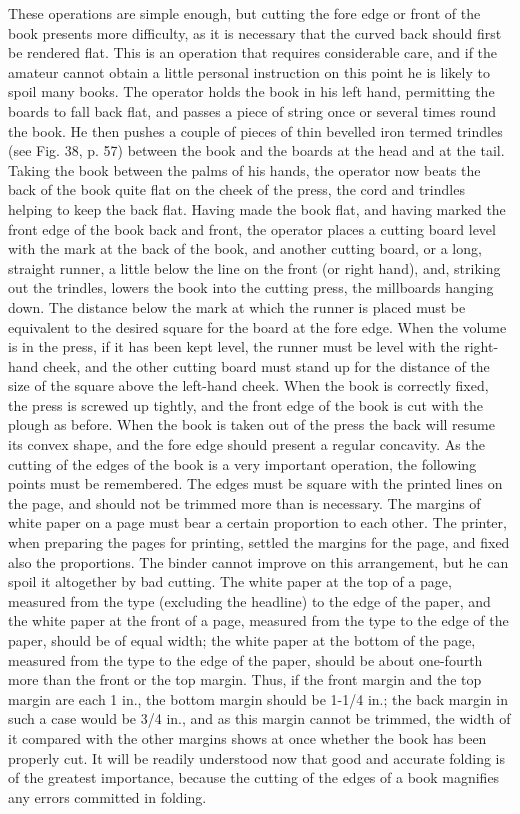 \documentclass[twoside]{book}
\begin{document}
These operations are simple enough, but cutting
the fore edge or front of the book presents more
difficulty, as it is necessary that the curved back
should first be rendered flat. This is an operation
that requires considerable care, and if the amateur
cannot obtain a little personal instruction on this
point he is likely to spoil many books. The operator
holds the book in his left hand, permitting the
boards to fall back flat, and passes a piece of string
once or several times round the book. He then
pushes a couple of pieces of thin bevelled iron
termed trindles (see Fig. 38, p. 57) between the
book and the boards at the head and at the tail.
Taking the book between the palms of his hands,
the operator now beats the back of the book
quite flat on the cheek of the press, the cord
and trindles helping to keep the back flat.
Having made the book flat, and having marked
the front edge of the book back and front, the
operator places a cutting board level with the
\pagebreak
mark at the back of the book, and another cutting
board, or a long, straight runner, a little below the
line on the front (or right hand), and, striking out
the trindles, lowers the book into the cutting press,
the millboards hanging down. The distance below
the mark at which the runner is placed must be
equivalent to the desired square for the board at
the fore edge. When the volume is in the press, if
it has been kept level, the runner must be level
with the right-hand cheek, and the other cutting
board must stand up for the distance of the size of
the square above the left-hand cheek. When the
book is correctly fixed, the press is screwed up
tightly, and the front edge of the book is cut with
the plough as before. When the book is taken out
of the press the back will resume its convex shape,
and the fore edge should present a regular concavity.
As the cutting of the edges of the book is a very
important operation, the following points must be
remembered. The edges must be square with the
printed lines on the page, and should not be
trimmed more than is necessary. The margins of
white paper on a page must bear a certain proportion
to each other. The printer, when preparing
the pages for printing, settled the margins for the
page, and fixed also the proportions. The binder
cannot improve on this arrangement, but he can
spoil it altogether by bad cutting. The white paper
at the top of a page, measured from the type
(excluding the headline) to the edge of the paper,
and the white paper at the front of a page, measured
from the type to the edge of the paper, should be
of equal width; the white paper at the bottom of
the page, measured from the type to the edge of the
paper, should be about one-fourth more than the
front or the top margin. Thus, if the front margin
and the top margin are each 1 in., the bottom margin
should be 1-1/4 in.; the back margin in such a case
\pagebreak
would be 3/4 in., and as this margin cannot be
trimmed, the width of it compared with the other
margins shows at once whether the book has been
properly cut. It will be readily understood now
that good and accurate folding is of the greatest
importance, because the cutting of the edges of a
book magnifies any errors committed in folding.
\end{document}
